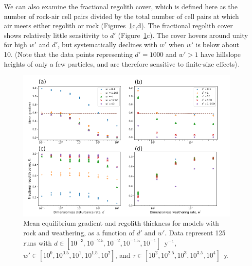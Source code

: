 \documentclass[esurf, manuscript]{copernicus}
\begin{document}
We can also examine the fractional regolith cover, which is defined here as the number of rock-air cell pairs divided by the total number of cell pairs at which air meets either regolith or rock (Figures~\ref{wxing4x4}c,d). The fractional regolith cover shows relatively little sensitivity to $d'$ (Figure~\ref{wxing4x4}c). The cover hovers around unity for high $w'$ and $d'$, but systematically declines with $w'$ when $w'$ is below about 10. (Note that the data points representing $d' = 1000$ and $w' > 1$ have hillslope heights of only a few particles, and are therefore sensitive to finite-size effects).

\begin{figure}[t]
\includegraphics[width=12cm]{Figures/wxing_slope_frac_cover.pdf}
\caption{Mean equilibrium gradient and regolith thickness for models with rock and weathering, as a function of $d'$ and $w'$. Data represent 125 runs with $d\in [10^{-3}, 10^{-2.5}, 10^{-2}, 10^{-1.5}, 10^{-1}]$~y$^{-1}$, $w' \in [10^0, 10^{0.5}, 10^1, 10^{1.5}, 10^2]$, and  $\tau\in [10^2, 10^{2.5}, 10^3, 10^{3.5}, 10^4]$~y.}
\label{wxing4x4}
\end{figure}
\end{document}

